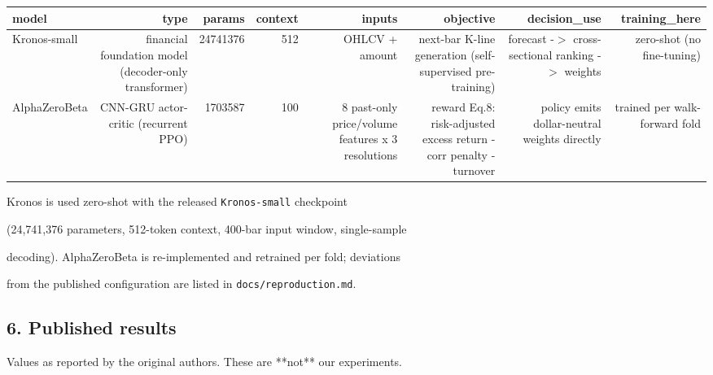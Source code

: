 \begin{center}\footnotesize\begin{longtable}{lrrrrrrr}
\toprule
model & type & params & context & inputs & objective & decision\_use & training\_here \\
\midrule
Kronos-small & financial foundation model (decoder-only transformer) & 24741376 & 512 & OHLCV + amount & next-bar K-line generation (self-supervised pre-training) & forecast -$>$ cross-sectional ranking -$>$ weights & zero-shot (no fine-tuning) \\
AlphaZeroBeta & CNN-GRU actor-critic (recurrent PPO) & 1703587 & 100 & 8 past-only price/volume features x 3 resolutions & reward Eq.8: risk-adjusted excess return - corr penalty - turnover & policy emits dollar-neutral weights directly & trained per walk-forward fold \\
\bottomrule
\end{longtable}\end{center}

Kronos is used zero-shot with the released \texttt{Kronos-small} checkpoint\par
(24,741,376 parameters, 512-token context, 400-bar input window, single-sample\par
decoding). AlphaZeroBeta is re-implemented and retrained per fold; deviations\par
from the published configuration are listed in \texttt{docs/reproduction.md}.\par

\subsection*{6. Published results}

Values as reported by the original authors. These are **not** our experiments.\par

